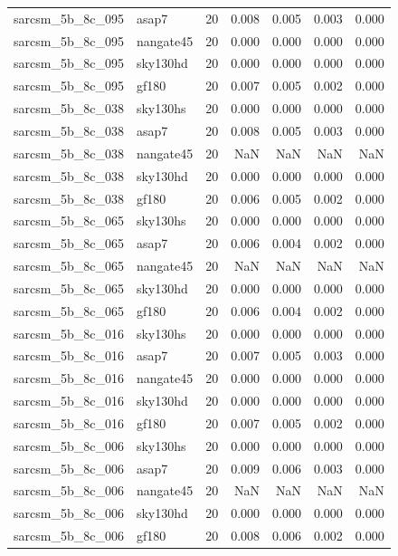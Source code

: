 \begin{tabular}{llrrrrr}
sarcsm\_5b\_8c\_095 & asap7 & 20 & 0.008 & 0.005 & 0.003 & 0.000 \\
sarcsm\_5b\_8c\_095 & nangate45 & 20 & 0.000 & 0.000 & 0.000 & 0.000 \\
sarcsm\_5b\_8c\_095 & sky130hd & 20 & 0.000 & 0.000 & 0.000 & 0.000 \\
sarcsm\_5b\_8c\_095 & gf180 & 20 & 0.007 & 0.005 & 0.002 & 0.000 \\
sarcsm\_5b\_8c\_038 & sky130hs & 20 & 0.000 & 0.000 & 0.000 & 0.000 \\
sarcsm\_5b\_8c\_038 & asap7 & 20 & 0.008 & 0.005 & 0.003 & 0.000 \\
sarcsm\_5b\_8c\_038 & nangate45 & 20 & NaN & NaN & NaN & NaN \\
sarcsm\_5b\_8c\_038 & sky130hd & 20 & 0.000 & 0.000 & 0.000 & 0.000 \\
sarcsm\_5b\_8c\_038 & gf180 & 20 & 0.006 & 0.005 & 0.002 & 0.000 \\
sarcsm\_5b\_8c\_065 & sky130hs & 20 & 0.000 & 0.000 & 0.000 & 0.000 \\
sarcsm\_5b\_8c\_065 & asap7 & 20 & 0.006 & 0.004 & 0.002 & 0.000 \\
sarcsm\_5b\_8c\_065 & nangate45 & 20 & NaN & NaN & NaN & NaN \\
sarcsm\_5b\_8c\_065 & sky130hd & 20 & 0.000 & 0.000 & 0.000 & 0.000 \\
sarcsm\_5b\_8c\_065 & gf180 & 20 & 0.006 & 0.004 & 0.002 & 0.000 \\
sarcsm\_5b\_8c\_016 & sky130hs & 20 & 0.000 & 0.000 & 0.000 & 0.000 \\
sarcsm\_5b\_8c\_016 & asap7 & 20 & 0.007 & 0.005 & 0.003 & 0.000 \\
sarcsm\_5b\_8c\_016 & nangate45 & 20 & 0.000 & 0.000 & 0.000 & 0.000 \\
sarcsm\_5b\_8c\_016 & sky130hd & 20 & 0.000 & 0.000 & 0.000 & 0.000 \\
sarcsm\_5b\_8c\_016 & gf180 & 20 & 0.007 & 0.005 & 0.002 & 0.000 \\
sarcsm\_5b\_8c\_006 & sky130hs & 20 & 0.000 & 0.000 & 0.000 & 0.000 \\
sarcsm\_5b\_8c\_006 & asap7 & 20 & 0.009 & 0.006 & 0.003 & 0.000 \\
sarcsm\_5b\_8c\_006 & nangate45 & 20 & NaN & NaN & NaN & NaN \\
sarcsm\_5b\_8c\_006 & sky130hd & 20 & 0.000 & 0.000 & 0.000 & 0.000 \\
sarcsm\_5b\_8c\_006 & gf180 & 20 & 0.008 & 0.006 & 0.002 & 0.000 \\

\end{tabular}
